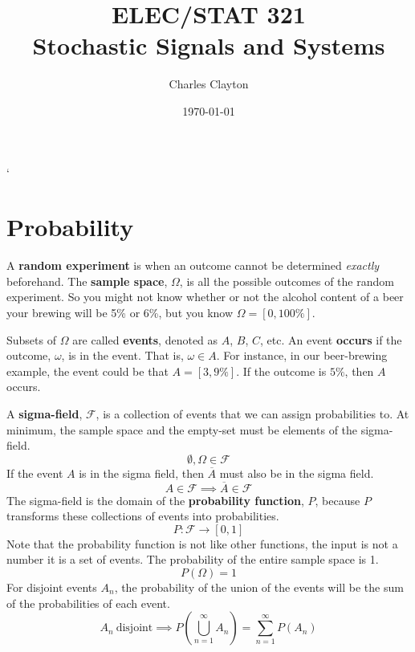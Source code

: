 \documentclass{article}
\begin{document}


\title{\huge ELEC/STAT 321 \\ \Large \medskip Stochastic Signals and Systems}
\author{Charles Clayton}
\date{\today}
\maketitle
`
\thispagestyle{empty}

\setcounter{page}{0}



\singlespacing			\pagebreak
\tableofcontents		\pagebreak

\listoffigures		
\listoftables
\listofmyequations
\pagebreak



\printnoidxglossaries	\pagebreak




\section{Probability}

A \textbf{random experiment} is when an outcome cannot be determined \textit{exactly} beforehand. The \textbf{sample space}, $\Omega$,  is all the possible outcomes of the random experiment. So you might not know whether or not the alcohol content of a beer your brewing will be 5\% or 6\%, but you know $\Omega=[0,100\%]$.

Subsets of $\Omega$ are called \textbf{events}, denoted as $A$, $B$, $C$, etc. An event \textbf{occurs} if the outcome, $\omega$, is in the event. That is, $\omega \in A$. For instance, in our beer-brewing example, the event could be that $A=[3,9\%]$. If the outcome is $5\%$, then $A$ occurs.

A \textbf{sigma-field}, $ \mathcal{F} $, is a collection of events that we can assign probabilities to. At minimum, the sample space and the empty-set must be elements of the sigma-field. $$ \emptyset, \Omega \in \mathcal{F} $$
If the event $A$ is in the sigma field, then $\overline{A}$ must also be in the sigma field. $$ A \in \mathcal{F} \implies \overline{A} \in \mathcal{F} $$
The sigma-field is the domain of the \textbf{probability function}, $P$, because $P$ transforms these collections of events into probabilities. $$P: \mathcal{F} \rightarrow [0,1]$$
Note that the probability function is not like other functions, the input is not a number it is a set of events. The probability of the entire sample space is 1. $$ P(\Omega) = 1 $$
For disjoint events $A_n$, the probability of the union of the events will be the sum of the probabilities of each event. $$ A_n\ \text{disjoint} \implies P(\bigcup_{n=1}^\infty A_n) = \sum_{n=1}^\infty P(A_n) $$
\end{document}
